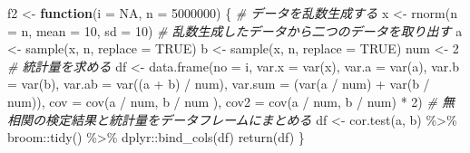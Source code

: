 \documentclass[]{tufte-handout}
\newenvironment{Shaded}{}{}
\newcommand{\AttributeTok}[1]{\textcolor[rgb]{0.49,0.56,0.16}{#1}}
\newcommand{\CommentTok}[1]{\textcolor[rgb]{0.38,0.63,0.69}{\textit{#1}}}
\newcommand{\ConstantTok}[1]{\textcolor[rgb]{0.53,0.00,0.00}{#1}}
\newcommand{\ControlFlowTok}[1]{\textcolor[rgb]{0.00,0.44,0.13}{\textbf{#1}}}
\newcommand{\DecValTok}[1]{\textcolor[rgb]{0.25,0.63,0.44}{#1}}
\newcommand{\FunctionTok}[1]{\textcolor[rgb]{0.02,0.16,0.49}{#1}}
\newcommand{\NormalTok}[1]{#1}
\newcommand{\OtherTok}[1]{\textcolor[rgb]{0.00,0.44,0.13}{#1}}
\newcommand{\SpecialCharTok}[1]{\textcolor[rgb]{0.25,0.44,0.63}{#1}}
\begin{document}
\begin{Shaded}
\begin{Highlighting}[numbers=left,,]
\NormalTok{f2 }\OtherTok{\textless{}{-}} \ControlFlowTok{function}\NormalTok{(}\AttributeTok{i =} \ConstantTok{NA}\NormalTok{, }\AttributeTok{n =} \DecValTok{5000000}\NormalTok{) \{}
  \CommentTok{\# データを乱数生成する}
\NormalTok{  x }\OtherTok{\textless{}{-}} \FunctionTok{rnorm}\NormalTok{(}\AttributeTok{n =}\NormalTok{ n, }\AttributeTok{mean =} \DecValTok{10}\NormalTok{, }\AttributeTok{sd =} \DecValTok{10}\NormalTok{)}
  \CommentTok{\# 乱数生成したデータから二つのデータを取り出す}
\NormalTok{  a }\OtherTok{\textless{}{-}} \FunctionTok{sample}\NormalTok{(x, n, }\AttributeTok{replace =} \ConstantTok{TRUE}\NormalTok{)}
\NormalTok{  b }\OtherTok{\textless{}{-}} \FunctionTok{sample}\NormalTok{(x, n, }\AttributeTok{replace =} \ConstantTok{TRUE}\NormalTok{)}
\NormalTok{  num }\OtherTok{\textless{}{-}} \DecValTok{2}
  \CommentTok{\# 統計量を求める}
\NormalTok{  df }\OtherTok{\textless{}{-}} \FunctionTok{data.frame}\NormalTok{(}\AttributeTok{no =}\NormalTok{ i,}
                   \AttributeTok{var.x =} \FunctionTok{var}\NormalTok{(x),}
                   \AttributeTok{var.a =} \FunctionTok{var}\NormalTok{(a), }\AttributeTok{var.b =} \FunctionTok{var}\NormalTok{(b),}
                   \AttributeTok{var.ab =} \FunctionTok{var}\NormalTok{((a }\SpecialCharTok{+}\NormalTok{ b) }\SpecialCharTok{/}\NormalTok{ num), }\AttributeTok{var.sum =}\NormalTok{ (}\FunctionTok{var}\NormalTok{(a }\SpecialCharTok{/}\NormalTok{ num) }\SpecialCharTok{+} \FunctionTok{var}\NormalTok{(b }\SpecialCharTok{/}\NormalTok{ num)),}
                   \AttributeTok{cov =} \FunctionTok{cov}\NormalTok{(a }\SpecialCharTok{/}\NormalTok{ num, b }\SpecialCharTok{/}\NormalTok{ num ),}
                   \AttributeTok{cov2 =} \FunctionTok{cov}\NormalTok{(a }\SpecialCharTok{/}\NormalTok{ num, b }\SpecialCharTok{/}\NormalTok{ num) }\SpecialCharTok{*} \DecValTok{2}\NormalTok{)}
  \CommentTok{\# 無相関の検定結果と統計量をデータフレームにまとめる}
\NormalTok{  df }\OtherTok{\textless{}{-}} \FunctionTok{cor.test}\NormalTok{(a, b) }\SpecialCharTok{\%\textgreater{}\%}\NormalTok{ broom}\SpecialCharTok{::}\FunctionTok{tidy}\NormalTok{() }\SpecialCharTok{\%\textgreater{}\%}\NormalTok{ dplyr}\SpecialCharTok{::}\FunctionTok{bind\_cols}\NormalTok{(df)}
  \FunctionTok{return}\NormalTok{(df)}
\NormalTok{\}}
\end{Highlighting}
\end{Shaded}
\end{document}
